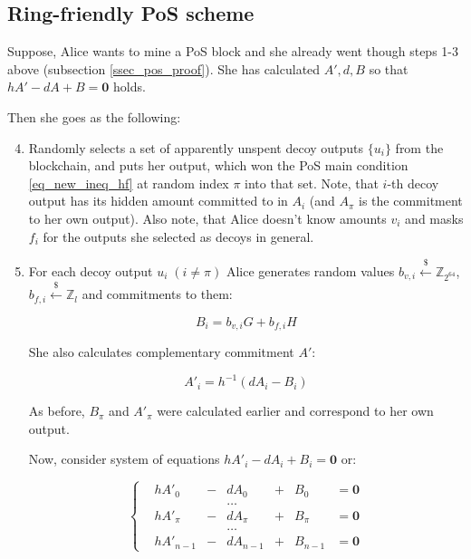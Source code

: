 \documentclass{article}
\numberwithin{figure}{section}
\begin{document}
\subsection{Ring-friendly PoS scheme}

Suppose, Alice wants to mine a PoS block and she already went though steps 1-3 above (subsection \ref{ssec_pos_proof}). She has calculated $A', d, B$ so that $ hA' - dA + B = \mathbf{0} $ holds.

Then she goes as the following:
\begin{enumerate}
    \setcounter{enumi}{3} 
    \item Randomly selects a set of apparently unspent decoy outputs $\{u_i\}$ from the blockchain, and puts her output, which won the PoS main condition \eqref{eq_new_ineq_hf} at random index $\pi$ into that set. Note, that $i$-th decoy output has its hidden amount committed to in $A_i$ (and $A_\pi$ is the commitment to her own output). Also note, that Alice doesn't know amounts $v_i$ and masks $f_i$ for the outputs she selected as decoys in general.
    
    \item For each decoy output $u_i \; (i \neq \pi)$ Alice generates random values $b_{v,i} \stackrel{\$}{\leftarrow} \mathbb{Z}_{2^{64}}$, $b_{f,i} \stackrel{\$}{\leftarrow} \mathbb{Z}_l$ and commitments to them: 
    
    \begin{equation} \label{rfpos_Bi}
        B_i = b_{v,i} G + b_{f,i} H
    \end{equation} 
    
    She also calculates complementary commitment $A'$:
    
    \begin{equation} \label{rfpos_Aprimei}
        A'_i = h^{-1}(dA_i - B_i)
    \end{equation}
    
    As before, $B_\pi$ and $A'_\pi$ were calculated earlier and correspond to her own output.
    
    Now, consider system of equations $hA'_i - dA_i + B_i = \mathbf{0}$ or:
    
    \begin{equation} \label{rfpos_sys}
    \left\{ \begin{aligned} 
        &h A'_0 &- &d A_0 &+ &B_0 &= \mathbf{0} \\
        &&& \dots &&& \\
        &h A'_\pi &- &d A_\pi &+  &B_\pi &= \mathbf{0} \\
        &&& \dots &&& \\
        &h A'_{n-1} &- &d A_{n-1} &+ &B_{n-1} &= \mathbf{0}
    \end{aligned} \right.
    \end{equation}
    

\end{enumerate}
\end{document}
